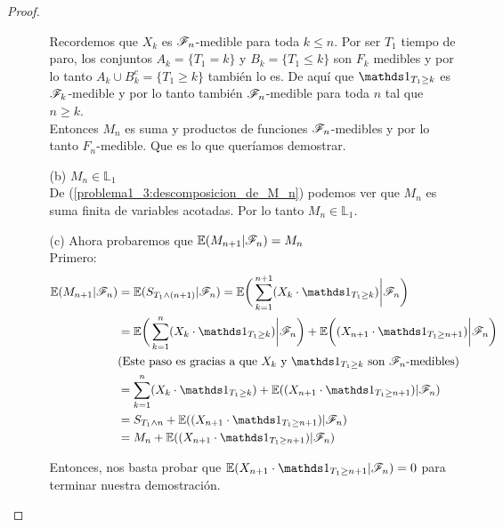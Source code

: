 \begin{proof}
\begin{enumerate}
\begin{itemize}
			 		Recordemos que $X_k$ es $\mathscr{F}_n$-medible para toda $k \leq n $. Por ser
			 		$T_1$ tiempo de paro, los conjuntos $A_k = \{T_1 = k\}$ y 
			 		$B_k = \{T_1 \leq k\}$	son $F_k$ medibles y por lo tanto 
			 		$A_k \cup B_k^c = \{ T_1 \geq k\}$ también lo es. De aquí que 
			 		$\indic_{T_1 \geq k}$ es $\mathscr{F}_k$-medible y por lo tanto también $\mathscr{F}_n$-medible
			 		para toda $n$ tal que $n \geq k$.\\
			 		  
			 		Entonces $M_n$ es suma y productos de funciones $\mathscr{F}_n$-medibles y por lo tanto
			 		$F_n$-medible. Que es lo que queríamos demostrar.\\
			 		
			 	\item[(b)]
			 		$M_n \in \mathbb{L}_1$\\
			 		
			 		De (\ref{problema1_3:descomposicion_de_M_n}) podemos ver que $M_n$ es 
			 		suma finita de variables acotadas. Por lo tanto $M_n \in \mathbb{L}_1$.\\
			 		
			 	\item[(c)] Ahora probaremos que	$\mathbb{E}(M_{n+1} | \mathscr{F}_{n}) = M_{n}$\\
			 		
			 		Primero:
			 		\begin{align}
			 			\E(M_{n+1} | \F_{n}) &= \E( S_{T_1 \wedge (n+1)} | \F_{n}) = 
			 			\E\bigg( \sum_{k=1}^{n+1} (X_k \cdot \indic_{T_1 \geq k})\bigg| \F_{n}\bigg) \\	 			
			 			& =\E\bigg( \sum_{k=1}^{n} (X_k \cdot \indic_{T_1 \geq k}) \bigg| \F_{n}\bigg) +
			 			\E\bigg((X_{n+1} \cdot \indic_{T_1 \geq n+1}) \bigg| \F_{n}\bigg) \\
			 			&\mbox{(Este paso es gracias a que $X_k$ y $\indic_{T_1 \geq k}$ son $\F_n$-medibles)}\\
			 			& = \sum_{k=1}^{n} (X_k \cdot \indic_{T_1 \geq k}) + 
			 			\E((X_{n+1} \cdot \indic_{T_1 \geq n+1}) | \F_{n}) \\
			 			& = S_{T_1 \wedge n} + \E((X_{n+1} \cdot \indic_{T_1 \geq n+1}) | \F_{n}) \\
			 			& = M_n + \E((X_{n+1} \cdot \indic_{T_1 \geq n+1}) | \F_{n})
			 		\end{align}
			 		
			 		Entonces, nos basta probar que $\E(X_{n+1} \cdot \indic_{T_1 \geq n+1} |
			 		 \F_{n}) = 0$ para terminar nuestra demostración.\\
			 		 

\end{itemize}
\end{enumerate}
\end{proof}
